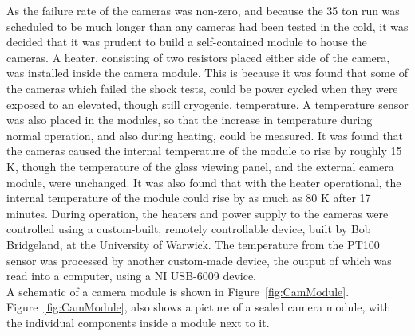As the failure rate of the cameras was non-zero, and because the 35 ton run was scheduled to be much longer than any cameras had been tested in the cold, it was decided that it was prudent to build a self-contained module to house the cameras. A heater, consisting of two resistors placed either side of the camera, was installed inside the camera module. This is because it was found that some of the cameras which failed the shock tests, could be power cycled when they were exposed to an elevated, though still cryogenic, temperature. A temperature sensor was also placed in the modules, so that the increase in temperature during normal operation, and also during heating, could be measured. It was found that the cameras caused the internal temperature of the module to rise by roughly 15 K, though the temperature of the glass viewing panel, and the external camera module, were unchanged. It was also found that with the heater operational, the internal temperature of the module could rise by as much as 80 K after 17 minutes. During operation, the heaters and power supply to the cameras were controlled using a custom-built, remotely controllable device, built by Bob Bridgeland, at the University of Warwick. The temperature from the PT100 sensor was processed by another custom-made device, the output of which was read into a computer, using a NI USB-6009 device. \\

A schematic of a camera module is shown in Figure~\ref{fig:CamModule}. Figure~\ref{fig:CamModule}, also shows a picture of a sealed camera module, with the individual components inside a module next to it. \\

